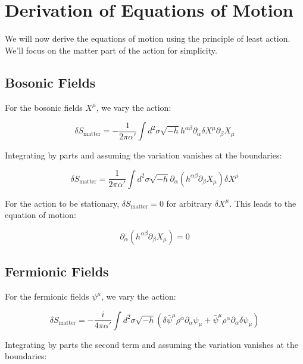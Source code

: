 \documentclass{article}
\begin{document}
\section{Derivation of Equations of Motion}

We will now derive the equations of motion using the principle of least action. We'll focus on the matter part of the action for simplicity.

\subsection{Bosonic Fields}

For the bosonic fields $X^\mu$, we vary the action:

\begin{equation}
\delta S_{\text{matter}} = -\frac{1}{2\pi\alpha'} \int d^2\sigma \sqrt{-h} h^{\alpha\beta} \partial_\alpha \delta X^\mu \partial_\beta X_\mu
\end{equation}

Integrating by parts and assuming the variation vanishes at the boundaries:

\begin{equation}
\delta S_{\text{matter}} = \frac{1}{2\pi\alpha'} \int d^2\sigma \sqrt{-h} \partial_\alpha (h^{\alpha\beta} \partial_\beta X_\mu) \delta X^\mu
\end{equation}

For the action to be stationary, $\delta S_{\text{matter}} = 0$ for arbitrary $\delta X^\mu$. This leads to the equation of motion:

\begin{equation}
\partial_\alpha (h^{\alpha\beta} \partial_\beta X_\mu) = 0
\end{equation}

\subsection{Fermionic Fields}

For the fermionic fields $\psi^\mu$, we vary the action:

\begin{equation}
\delta S_{\text{matter}} = -\frac{i}{4\pi\alpha'} \int d^2\sigma \sqrt{-h} (\delta\bar{\psi}^\mu \rho^\alpha \partial_\alpha \psi_\mu + \bar{\psi}^\mu \rho^\alpha \partial_\alpha \delta\psi_\mu)
\end{equation}

Integrating by parts the second term and assuming the variation vanishes at the boundaries:
\end{document}
